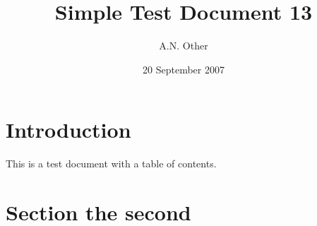 \documentclass{article}
\date{20 September 2007}
\author{A.N. Other}
\title{Simple Test Document 13}
\begin{document}
\maketitle

\tableofcontents
\pagebreak

\section{Introduction}

This is a test document with a table of contents.

\pagebreak
\section{Section the second}
\end{document}

